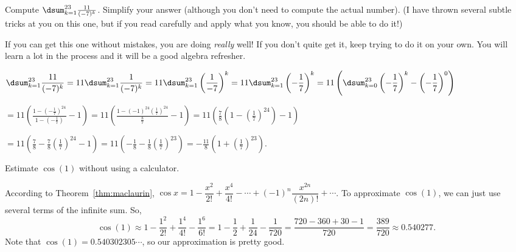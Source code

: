\begin{requ}
Compute $\dsum_{k=1}^{23} \frac{11}{(-7)^k}$.  
Simplify your answer (although you don't need to compute the actual number). 
(I have thrown several subtle tricks at you on this one, but if you read carefully and apply what you know,
you should be able to do it!)
\begin{requanswer}
If you can get this one without mistakes, you are doing {\em really} well! If you don't quite get it, keep
trying to do it on your own. You will learn a lot in the process and it will be a good algebra refresher.

$\displaystyle
\dsum_{k=1}^{23} \frac{11}{(-7)^k} 
= 11\dsum_{k=1}^{23} \frac{1}{(-7)^k}
= 11\dsum_{k=1}^{23} \left(\frac{1}{-7}\right)^k
= 11\dsum_{k=1}^{23} \left(-\frac{1}{7}\right)^k
= 11\left(\dsum_{k=0}^{23} \left(-\frac{1}{7}\right)^k - \left(-\frac{1}{7}\right)^0\right)
$

$\displaystyle
= 11\left( \frac{1-\left(-\frac{1}{7}\right)^{24}}{1-\left(-\frac{1}{7}\right)} - 1\right)
= 11\left( \frac{1-\left(-1\right)^{24}\left(\frac{1}{7}\right)^{24}}{\frac{8}{7}} - 1\right)
= 11\left( \frac{7}{8}\left(1-\left(\frac{1}{7}\right)^{24}\right) - 1\right)
$

$\displaystyle
= 11\left(\frac{7}{8} -\frac{7}{8}\left(\frac{1}{7}\right)^{24} - 1\right)
= 11\left(-\frac{1}{8} -\frac{1}{8}\left(\frac{1}{7}\right)^{23}\right)
= -\frac{11}{8}\left(1+\left(\frac{1}{7}\right)^{23}\right)
$.
\end{requanswer}
\end{requ}

\begin{requ}
Estimate $\cos (1)$ without using a calculator. 
\begin{requanswer}
According to Theorem~\ref{thm:maclaurin}, 
$\cos x = 1 - \dfrac{x^2}{2!} + \dfrac{x^4}{4!} - \cdots +(-1)^n\dfrac{x^{2n}}{(2n)!} +  \cdots$.
To approximate $\cos(1)$, we can just use several terms of the infinite sum.
So, 
$$\cos(1) \approx 1 - \dfrac{1^2}{2!} + \dfrac{1^4}{4!} -  \dfrac{1^6}{6!} 
=1-\dfrac{1}{2}+\dfrac{1}{24}-\dfrac{1}{720}
=\dfrac{720-360+30-1}{720} = \dfrac{389}{720}\approx 0.540277.$$
Note that $\cos(1)=0.540302305\cdots $, so our approximation is pretty good.
\end{requanswer}
\end{requ}



